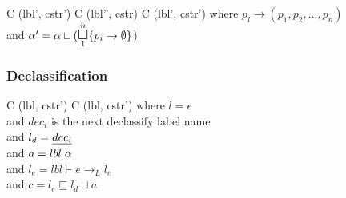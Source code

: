 \begin{trules}
        { {C} {(lbl', cstr')} }
        { {C} {(lbl'', cstr)} \;
          {C} {(lbl', cstr')} }
        {where $p_l \rightarrow (p_1, p_2, \dots, p_n)$\\
          and $\ia' = \ia \sqcup (\mathlarger\sqcupl\limits_1^n \{ p_i \rightarrow \emptyset \}$) }
\end{trules}

\subsubsection{Declassification}

\begin{trules}
        { {C} {(lbl, cstr')} }
        { {C} {(lbl, cstr')} }
        {where $l = \epsilon$\\
          and $dec_i$ is the next declassify label name\\
          and $l_d = \underline{dec_i}$\\
          and $a = lbl \; \alpha$\\
          and $l_e = lbl \vdash e \rightarrow_L l_e$\\
          and $c = l_e \sqsubseteq l_d \sqcup a$}
\end{trules}
